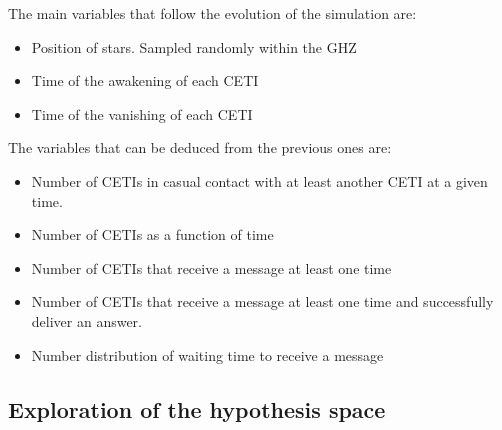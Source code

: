 \documentclass[crop]{CSLB}%
\begin{document}
The main variables that follow the evolution of the simulation are:

\begin{itemize}
   \item Position of stars.  Sampled randomly within the GHZ
   \item Time of the awakening of each CETI
   \item Time of the vanishing of each CETI
\end{itemize}

The variables that can be deduced from the previous ones are:

\begin{itemize}
   \item Number of CETIs in casual contact with at least another CETI
      at a given time.
   \item Number of CETIs as a function of time
   \item Number of CETIs that receive a message at least one time
   \item Number of CETIs that receive a message at least one time and
      successfully deliver an answer.
   \item Number distribution of waiting time to receive a message
\end{itemize}




\subsection{Exploration of the hypothesis space}






                   
\end{document}
